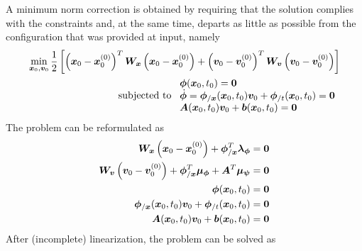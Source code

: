 \documentclass[10pt,fleqn,subeqn]{report}
\newcommand{\T}[1]{\bm{#1}}
\newcommand{\TT}[1]{\bm{#1}}
\begin{document}
A minimum norm correction is obtained by requiring that the solution complies
with the constraints and, at the same time, departs as little as possible
from the configuration that was provided at input, namely
\begin{align}
	\min_{\T{x}_0, \T{v}_0} \frac{1}{2} \sqbr{
		\plbr{\T{x}_0 - \T{x}_0^{(0)}}^T \TT{W}_{\T{x}} \plbr{\T{x}_0 - \T{x}_0^{(0)}}
		+
		\plbr{\T{v}_0 - \T{v}_0^{(0)}}^T \TT{W}_{\T{v}} \plbr{\T{v}_0 - \T{v}_0^{(0)}}
	}
	\nonumber \\
	\text{subjected to }
	\lvvect{
		\T{\phi}(\T{x}_0, t_0) = \T{0}
		\\
		\dot{\T{\phi}} = \T{\phi}_{/\T{x}}(\T{x}_0, t_0) \T{v}_0 + \T{\phi}_{/t}(\T{x}_0, t_0) = \T{0}
		\\
		\TT{A}(\T{x}_0, t_0) \T{v}_0 + \T{b}(\T{x}_0, t_0) = \T{0}
	}
\end{align}
The problem can be reformulated as
\begin{subequations}
\label{eq:initial-assembly:min}
\begin{align}
	\TT{W}_{\T{x}} \plbr{\T{x}_0 - \T{x}_0^{(0)}}
	+
	\T{\phi}_{/\T{x}}^T \T{\lambda}_{\T{\phi}}
	&=
	\T{0}
	\label{eq:initial-assembly:min:x}
	\\
	\TT{W}_{\T{v}} \plbr{\T{v}_0 - \T{v}_0^{(0)}}
	+
	\T{\phi}_{/\T{x}}^T \T{\mu}_{\T{\phi}}
	+
	\TT{A}^T \T{\mu}_{\T{\psi}}
	&=
	\T{0}
	\label{eq:initial-assembly:min:v}
	\\
	\T{\phi}(\T{x}_0, t_0) &= \T{0}
	\label{eq:initial-assembly:min:phi}
	\\
	\T{\phi}_{/\T{x}}(\T{x}_0, t_0) \T{v}_0 + \T{\phi}_{/t}(\T{x}_0, t_0) &= \T{0}
	\label{eq:initial-assembly:min:dphi}
	\\
	\TT{A}(\T{x}_0, t_0) \T{v}_0 + \T{b}(\T{x}_0, t_0) &= \T{0}
	\label{eq:initial-assembly:min:psi}
\end{align}
\end{subequations}
After (incomplete) linearization, the problem can be solved as
\end{document}

